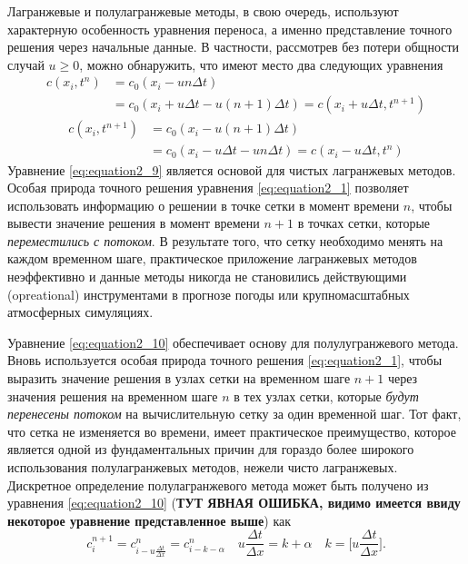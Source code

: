 Лагранжевые и полулагранжевые методы, в свою очередь, используют характерную особенность уравнения переноса, а именно представление точного решения через начальные данные. В частности, рассмотрев без потери общности случай $u\ge0$, можно обнаружить, что имеют место два следующих уравнения
%
\begin{equation}
\label{eq:equation2_8}
\begin{split}
c (x_i, t^n) & = c_0(x_i - un\Delta t) {} \\
		     & {} = c_0(x_i + u\Delta t - u(n+1)\Delta t) = c(x_i + u\Delta t, t^{n+1})
\end{split}
\end{equation}
%
%
\begin{equation}
\label{eq:equation2_9}
\begin{split}
c (x_i, t^{n+1}) & = c_0(x_i - u(n+1)\Delta t) {} \\
& {} = c_0(x_i - u\Delta t - un\Delta t) = c(x_i - u\Delta t, t^{n})
\end{split}
\end{equation}
%
Уравнение \eqref{eq:equation2_9} является основой для чистых лагранжевых методов. Особая природа точного решения уравнения \eqref{eq:equation2_1} позволяет использовать информацию о решении в точке сетки в момент времени $n$, чтобы вывести значение решения в момент времени $n+1$ в точках сетки, которые \textit{переместились с потоком}. В результате того, что сетку необходимо менять на каждом временном шаге, практическое приложение лагранжевых методов неэффективно и данные методы никогда не становились действующими (opreational) инструментами в прогнозе погоды или крупномасштабных атмосферных симуляциях.

Уравнение \eqref{eq:equation2_10} обеспечивает основу для полулугранжевого метода. Вновь используется особая природа точного решения \eqref{eq:equation2_1}, чтобы выразить значение решения в узлах сетки на временном шаге $n+1$ через значения решения на временном шаге $n$ в тех узлах сетки, которые \textit{будут перенесены потоком} на вычислительную сетку за один временной шаг.
Тот факт, что сетка не изменяется во времени, имеет практическое преимущество, которое является одной из фундаментальных причин для гораздо более широкого использования полулагранжевых методов, нежели чисто лагранжевых. Дискретное определение полулагранжевого метода может быть получено из уравнения \eqref{eq:equation2_10} (\textbf{ТУТ ЯВНАЯ ОШИБКА, видимо имеется ввиду некоторое уравнение представленное выше}) как
%
\begin{equation}
\label{eq:equation2_10}
c_i^{n+1} = c_{i-u\frac{\Delta t}{\Delta x}}^{n} = c_{i-k-\alpha}^n \quad u\frac{\Delta t}{\Delta x} = k + \alpha \quad k = \Big[u\frac{\Delta t}{\Delta x}\Big].
\end{equation}
%

